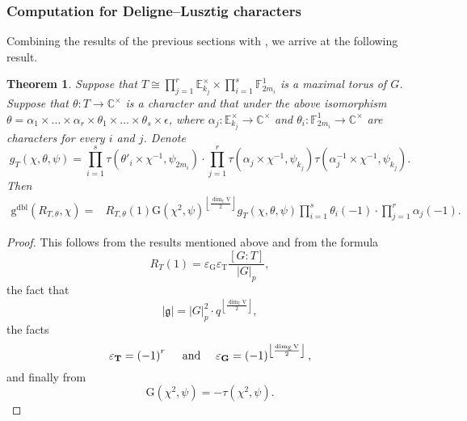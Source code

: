 \documentclass[12pt, reqno]{amsart}
\newtheorem{theorem}{Theorem}[section]
\theoremstyle{definition}
\theoremstyle{definition}
\theoremstyle{definition}
\newcommand{\cComplex}{\mathbb{C}}
\newcommand{\multiplicativegroup}[1]{#1^{\times}}
\newcommand{\sizeof}[1]{\left|#1\right|}
\newcommand{\hermitianSpace}{\mathrm{V}}
\newcommand{\fieldCharacter}{\psi}
\newcommand{\grpIndex}[2]{\left[#1:#2\right]}
\newcommand{\finiteField}{\mathbb{F}}
\newcommand{\quadraticExtension}{\mathbb{E}}
\newcommand{\finiteFieldExtension}[1]{\finiteField_{#1}}
\newcommand{\quadraticFieldExtension}[1]{\quadraticExtension_{#1}}
\newcommand{\GaussSumScalar}[2]{\mathrm{G}\left(#1, #2\right)}
\newcommand{\dblVirtualGaussSumScalar}[2]{\mathrm{g}^{\mathrm{dbl}}\left(#1, #2\right)}
\newcommand{\GaussSumCharacter}[3]{\tau\left(#1 \times #2, #3\right)}
\newcommand{\lieAlgebra}{\mathfrak{g}}
\newcommand{\algebraicGroup}[1]{\boldsymbol{\mathrm{#1}}}
\begin{document}
\subsubsection{Computation for Deligne--Lusztig characters}
Combining the results of the previous sections with , we arrive at the following result.

\begin{theorem}\label{thm:computation-of-doubling-gauss-sum-scalar-for-deligne-lusztig-characters}
	Suppose that $T \cong \prod_{j=1}^r \multiplicativegroup{\quadraticFieldExtension{k_j}} \times \prod_{i=1}^s \finiteFieldExtension{2m_i}^1$ is a maximal torus of $G$. Suppose that $\theta \colon T \to \multiplicativegroup{\cComplex}$ is a character and that under the above isomorphism $\theta = \alpha_1 \times \dots \times \alpha_r \times \theta_1 \times \dots \times \theta_s \times \epsilon$, where $\alpha_j \colon \multiplicativegroup{\quadraticFieldExtension{k_j}} \to \multiplicativegroup{\cComplex}$ and $\theta_i \colon \finiteFieldExtension{2m_i}^1 \to \multiplicativegroup{\cComplex}$ are characters for every $i$ and $j$. Denote $$g_T\left(\chi, \theta, \fieldCharacter\right) = \prod_{i=1}^s \GaussSumCharacter{\theta'_i}{\chi^{-1}}{\fieldCharacter_{2m_i}} \cdot  \prod_{j=1}^r \GaussSumCharacter{\alpha_j}{\chi^{-1}}{\fieldCharacter_{k_j}} \GaussSumCharacter{\alpha_j^{-1}}{\chi^{-1}}{\fieldCharacter_{k_j}}.$$ Then
	\begin{align*}
		 \dblVirtualGaussSumScalar{R_{T, \theta}}{\chi} =& R_{T,\theta}\left(1\right) \GaussSumScalar{\chi^2}{\fieldCharacter}^{\left\lfloor\frac{\dim_{\quadraticExtension} \hermitianSpace}{2}\right\rfloor} g_T\left(\chi, \theta, \fieldCharacter\right) \prod_{i=1}^s \theta_i\left(-1\right) \cdot \prod_{j=1}^r \alpha_j\left(-1\right).
	\end{align*}
\end{theorem}
\begin{proof}
	This follows from the results mentioned above and from the formula $$R_T\left(1\right) = \varepsilon_{\algebraicGroup{G}} \varepsilon_{\algebraicGroup{T}} \frac{\grpIndex{G}{T}}{\sizeof{G}_p},$$ the fact that $$ \sizeof{\lieAlgebra} = \sizeof{G}_p^2 \cdot q^{\left\lfloor\frac{\dim_{\quadraticExtension} \hermitianSpace}{2}\right\rfloor},$$
	the facts \begin{equation*}
		\varepsilon_{\algebraicGroup{T}} = \left(-1\right)^r \text{\,\,\,\,\,\, and \,\,\,\,\,\,}  \varepsilon_{\algebraicGroup{G}} = \left(-1\right)^{\left\lfloor\frac{\dim_{\quadraticExtension} \hermitianSpace}{2}\right\rfloor},
	\end{equation*}
	and finally from $$\GaussSumScalar{\chi^2}{\fieldCharacter} = -\tau\left(\chi^2, \fieldCharacter\right).$$
\end{proof}
\end{document}
